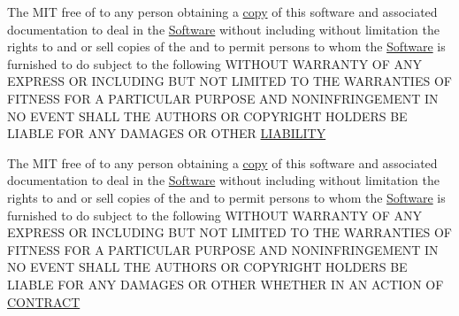 \begin{DoxyCompactItemize}
The M\+I\+T free of to any person obtaining a \hyperlink{license_8txt_aff1d4c6b756ebf691fa44a0904f68658}{copy} of this software and associated documentation to deal in the \hyperlink{license_8txt_a22a1529885b3e9d66b0c72fe604fc3dc}{Software} without including without limitation the rights to and or sell copies of the and to permit persons to whom the \hyperlink{license_8txt_a22a1529885b3e9d66b0c72fe604fc3dc}{Software} is furnished to do subject to the following W\+I\+T\+H\+O\+U\+T W\+A\+R\+R\+A\+N\+T\+Y O\+F A\+N\+Y E\+X\+P\+R\+E\+S\+S O\+R I\+N\+C\+L\+U\+D\+I\+N\+G B\+U\+T N\+O\+T L\+I\+M\+I\+T\+E\+D T\+O T\+H\+E W\+A\+R\+R\+A\+N\+T\+I\+E\+S O\+F F\+I\+T\+N\+E\+S\+S F\+O\+R A P\+A\+R\+T\+I\+C\+U\+L\+A\+R P\+U\+R\+P\+O\+S\+E A\+N\+D N\+O\+N\+I\+N\+F\+R\+I\+N\+G\+E\+M\+E\+N\+T I\+N N\+O E\+V\+E\+N\+T S\+H\+A\+L\+L T\+H\+E A\+U\+T\+H\+O\+R\+S O\+R C\+O\+P\+Y\+R\+I\+G\+H\+T H\+O\+L\+D\+E\+R\+S B\+E L\+I\+A\+B\+L\+E F\+O\+R A\+N\+Y D\+A\+M\+A\+G\+E\+S O\+R O\+T\+H\+E\+R \hyperlink{license_8txt_a154c0f6f925190567752588d1ff5458f}{L\+I\+A\+B\+I\+L\+I\+T\+Y}
\item 
The M\+I\+T free of to any person obtaining a \hyperlink{license_8txt_aff1d4c6b756ebf691fa44a0904f68658}{copy} of this software and associated documentation to deal in the \hyperlink{license_8txt_a22a1529885b3e9d66b0c72fe604fc3dc}{Software} without including without limitation the rights to and or sell copies of the and to permit persons to whom the \hyperlink{license_8txt_a22a1529885b3e9d66b0c72fe604fc3dc}{Software} is furnished to do subject to the following W\+I\+T\+H\+O\+U\+T W\+A\+R\+R\+A\+N\+T\+Y O\+F A\+N\+Y E\+X\+P\+R\+E\+S\+S O\+R I\+N\+C\+L\+U\+D\+I\+N\+G B\+U\+T N\+O\+T L\+I\+M\+I\+T\+E\+D T\+O T\+H\+E W\+A\+R\+R\+A\+N\+T\+I\+E\+S O\+F F\+I\+T\+N\+E\+S\+S F\+O\+R A P\+A\+R\+T\+I\+C\+U\+L\+A\+R P\+U\+R\+P\+O\+S\+E A\+N\+D N\+O\+N\+I\+N\+F\+R\+I\+N\+G\+E\+M\+E\+N\+T I\+N N\+O E\+V\+E\+N\+T S\+H\+A\+L\+L T\+H\+E A\+U\+T\+H\+O\+R\+S O\+R C\+O\+P\+Y\+R\+I\+G\+H\+T H\+O\+L\+D\+E\+R\+S B\+E L\+I\+A\+B\+L\+E F\+O\+R A\+N\+Y D\+A\+M\+A\+G\+E\+S O\+R O\+T\+H\+E\+R W\+H\+E\+T\+H\+E\+R I\+N A\+N A\+C\+T\+I\+O\+N O\+F \hyperlink{license_8txt_a808df707d490e1041f54a1d24fbbfaa0}{C\+O\+N\+T\+R\+A\+C\+T}
\item 

\end{DoxyCompactItemize}
